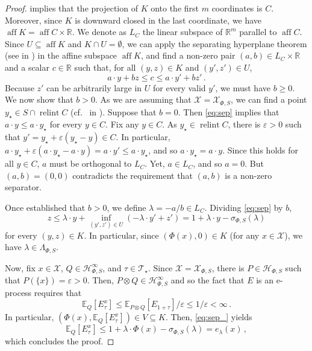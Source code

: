 \documentclass[10pt, a4paper]{article}
\newcommand{\E}{\mathbb E}
\newcommand{\e}{e}
\newcommand{\Hh}{\mathcal H}
\newcommand{\HhP}{\Hh_{\Phi,S}}
\newcommand{\LP}{\Lambda_{\Phi,S}}
\newcommand{\R}{\mathbb R}
\newcommand{\sP}{\sigma_{\Phi,S}}
\newcommand{\T}{\mathcal T}
\newcommand{\X}{\mathcal X}
\newcommand{\XP}{\X_{\Phi,S}}
\DeclareMathOperator{\aff}{aff}
\DeclareMathOperator{\relint}{relint}
\begin{document}
\begin{proof}
     implies that the projection of $K$ onto the first $m$ coordinates is $C$. Moreover, since $K$ is downward closed in the last coordinate, we have $\aff K = \aff C\times\R$. We denote as $L_C$ the linear subspace of $\R^m$ parallel to $\aff C$. Since $U\subseteq\aff K$ and $K\cap U=\emptyset$, we can  apply the separating hyperplane theorem (see  in ) in the affine subspace $\aff K$, and find a non-zero pair $(a,b)\in L_C\times\R$ and a scalar $c\in\R$ such that, for all $(y,z)\in K$ and $(y',z')\in U$, 
    \begin{equation}\label{eq:sep}a\cdot y + bz \leq c\leq a\cdot y' + bz'\,.\end{equation}
    Because $z'$ can be arbitrarily large in $U$ for every valid $y'$, we must have $b\geq 0$. We now show that $b>0$. As we are assuming that $\X=\XP$, we can find a point $y_\star\in S\cap\relint C$ (cf.~ in ). Suppose that $b=0$. Then \eqref{eq:sep} implies that  $a\cdot y\leq a\cdot y_\star$ for every $y\in C$. Fix any $y\in C$. As $y_\star\in\relint C$, there is $\varepsilon>0$ such that $y' = y_\star + \varepsilon(y_\star - y)\in C$. In particular, $a\cdot y_\star + \varepsilon(a\cdot y_\star - a\cdot y) = a\cdot y'\leq a\cdot y_\star$, and so $a\cdot y_\star = a\cdot y$. Since this holds for all $y\in C$, $a$ must be orthogonal to $L_C$. Yet, $a\in L_C$, and so $a = 0$. But $(a,b) = (0,0)$ contradicts the requirement that $(a,b)$ is a non-zero separator. 

    Once established that $b>0$, we  define $\lambda =- a/b\in L_C$. Dividing \eqref{eq:sep} by $b$,
    \begin{equation}\label{eq:sep_}
        z\leq\lambda\cdot y + \inf_{(y',z')\in U}(-\lambda\cdot y' + z') = 1 + \lambda\cdot y - \sP(\lambda)
    \end{equation}
    for every $(y,z)\in K$. In particular, since $(\Phi(x),0)\in K$ (for any $x\in\X$), we have $\lambda\in\LP$.
    
    Now, fix $x\in\X$, $Q\in\HhP^\infty$, and $\tau\in\T_\star$. Since $\X=\XP$, there is $P\in\HhP$ such that $P(\{x\})=\varepsilon>0$. Then, $P\otimes Q\in\HhP^\infty$ and so the fact that $E$ is an e-process requires that $$\E_Q[E_\tau^x]\leq \E_{P\otimes Q}[E_{1+\tau}]/\varepsilon\leq 1/\varepsilon<\infty\,.$$
    In particular, $(\Phi(x), \E_Q[E^x_\tau])\in V\subseteq K$. Then, \eqref{eq:sep_} yields
    $$\E_Q[E^x_\tau]\leq 1+\lambda\cdot\Phi(x) - \sP(\lambda) = \e_\lambda(x)\,,$$ which concludes the proof. 
\end{proof}
\end{document}
